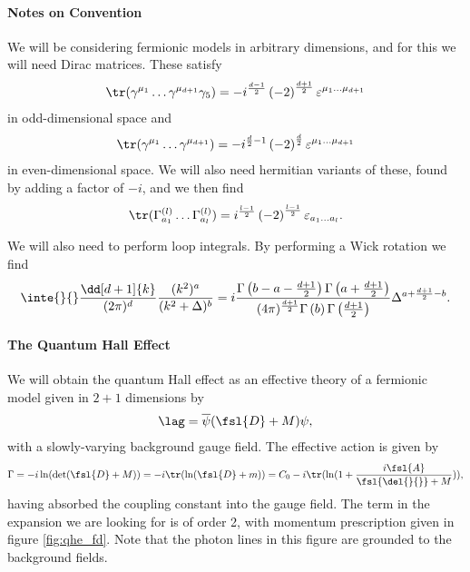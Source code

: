 \paragraph{Notes on Convention}
We will be considering fermionic models in arbitrary dimensions, and for this we will need Dirac matrices. These satisfy
\begin{align*}
	\tr(\gamma^{\mu_{1}}\dots\gamma^{\mu_{d + 1}}\gamma_{5}) = -i^{\frac{d - 1}{2}}\left(-2\right)^{\frac{d + 1}{2}}\varepsilon^{\mu_{1}\dots\mu_{d + 1}}
\end{align*}
in odd-dimensional space and
\begin{align*}
	\tr(\gamma^{\mu_{1}}\dots\gamma^{\mu_{d + 1}}) =  -i^{\frac{d}{2} - 1}\left(-2\right)^{\frac{d}{2}}\varepsilon^{\mu_{1}\dots\mu_{d + 1}}
\end{align*}
in even-dimensional space. We will also need hermitian variants of these, found by adding a factor of $-i$, and we then find
\begin{align*}
	\tr(\Gamma_{a_{1}}^{(l)}\dots\Gamma_{a_{l}}^{(l)}) =  i^{\frac{l - 1}{2}}\left(-2\right)^{\frac{l - 1}{2}}\varepsilon_{a_{1}\dots a_{l}}.
\end{align*}

We will also need to perform loop integrals. By performing a Wick rotation we find
\begin{align*}
	\inte{}{}\frac{\dd[d + 1]{k}}{(2\pi)^{d}}\frac{(k^{2})^{a}}{(k^{2} + \Delta)^{b}} = i\frac{\Gamma\left(b - a - \frac{d + 1}{2}\right)\Gamma\left(a + \frac{d + 1}{2}\right)}{(4\pi)^{\frac{d + 1}{2}}\Gamma\left(b\right)\Gamma\left(\frac{d + 1}{2}\right)}\Delta^{a + \frac{d + 1}{2} - b}.
\end{align*}

\paragraph{The Quantum Hall Effect}
We will obtain the quantum Hall effect as an effective theory of a fermionic model given in $2 + 1$ dimensions by
\begin{align*}
	\lag = \overline{\psi}(\fsl{D} + M)\psi,
\end{align*}
with a slowly-varying background gauge field. The effective action is given by
\begin{align*}
	\Gamma = -i\ln(\det(\fsl{D} + M)) = -i\tr(\ln(\fsl{D} + m)) = C_{0} - i\tr(\ln(1 + \frac{i\fsl{A}}{\fsl{\del{}{}} + M})),
\end{align*}
having absorbed the coupling constant into the gauge field. The term in the expansion we are looking for is of order 2, with momentum prescription given in figure \ref{fig:qhe_fd}. Note that the photon lines in this figure are grounded to the background fields.


